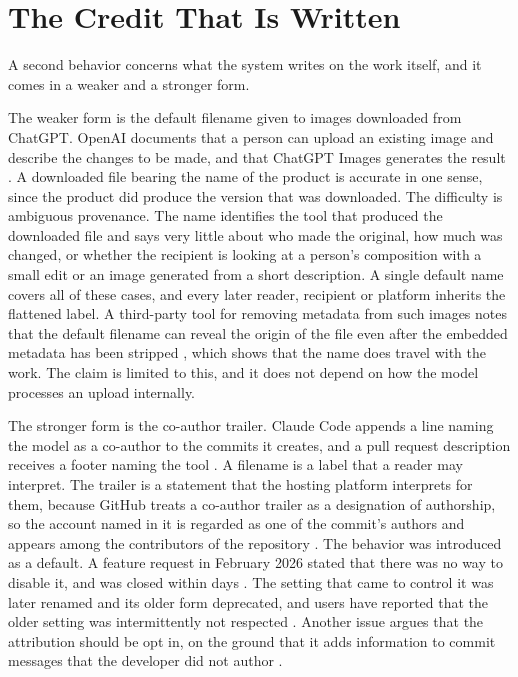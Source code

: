 \documentclass[11pt]{article}
\begin{document}
\section{The Credit That Is Written}

A second behavior concerns what the system writes on the work itself, and it comes in a weaker and a stronger form.

The weaker form is the default filename given to images downloaded from ChatGPT. OpenAI documents that a person can upload an existing image and describe the changes to be made, and that ChatGPT Images generates the result \cite{openaihelp2026}. A downloaded file bearing the name of the product is accurate in one sense, since the product did produce the version that was downloaded. The difficulty is ambiguous provenance. The name identifies the tool that produced the downloaded file and says very little about who made the original, how much was changed, or whether the recipient is looking at a person's composition with a small edit or an image generated from a short description. A single default name covers all of these cases, and every later reader, recipient or platform inherits the flattened label. A third-party tool for removing metadata from such images notes that the default filename can reveal the origin of the file even after the embedded metadata has been stripped \cite{nanoglobals}, which shows that the name does travel with the work. The claim is limited to this, and it does not depend on how the model processes an upload internally.

The stronger form is the co-author trailer. Claude Code appends a line naming the model as a co-author to the commits it creates, and a pull request description receives a footer naming the tool \cite{classmethod2026}. A filename is a label that a reader may interpret. The trailer is a statement that the hosting platform interprets for them, because GitHub treats a co-author trailer as a designation of authorship, so the account named in it is regarded as one of the commit's authors and appears among the contributors of the repository \cite{classmethod2026}. The behavior was introduced as a default. A feature request in February 2026 stated that there was no way to disable it, and was closed within days \cite{issue22585}. The setting that came to control it was later renamed and its older form deprecated, and users have reported that the older setting was intermittently not respected \cite{issue4224,issue7543}. Another issue argues that the attribution should be opt in, on the ground that it adds information to commit messages that the developer did not author \cite{issue27083}.
\end{document}
